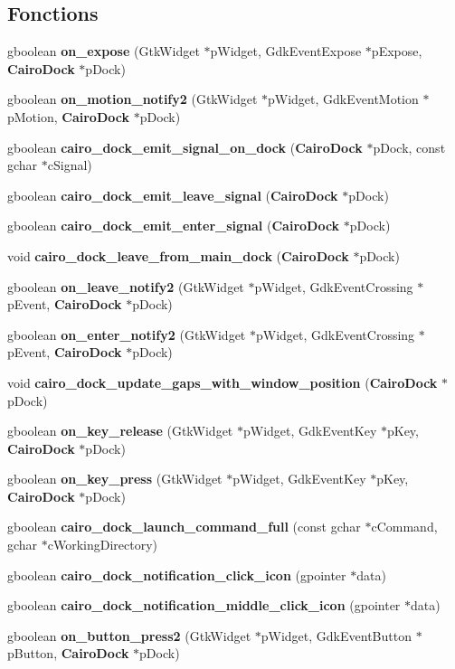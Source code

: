 \subsection*{Fonctions}
\begin{CompactItemize}
\item 
gboolean {\bf on\_\-expose} (GtkWidget $\ast$pWidget, GdkEventExpose $\ast$pExpose, {\bf CairoDock} $\ast$pDock)
\item 
gboolean {\bf on\_\-motion\_\-notify2} (GtkWidget $\ast$pWidget, GdkEventMotion $\ast$pMotion, {\bf CairoDock} $\ast$pDock)
\item 
gboolean {\bf cairo\_\-dock\_\-emit\_\-signal\_\-on\_\-dock} ({\bf CairoDock} $\ast$pDock, const gchar $\ast$cSignal)
\item 
gboolean {\bf cairo\_\-dock\_\-emit\_\-leave\_\-signal} ({\bf CairoDock} $\ast$pDock)
\item 
gboolean {\bf cairo\_\-dock\_\-emit\_\-enter\_\-signal} ({\bf CairoDock} $\ast$pDock)
\item 
void {\bf cairo\_\-dock\_\-leave\_\-from\_\-main\_\-dock} ({\bf CairoDock} $\ast$pDock)
\item 
gboolean {\bf on\_\-leave\_\-notify2} (GtkWidget $\ast$pWidget, GdkEventCrossing $\ast$pEvent, {\bf CairoDock} $\ast$pDock)
\item 
gboolean {\bf on\_\-enter\_\-notify2} (GtkWidget $\ast$pWidget, GdkEventCrossing $\ast$pEvent, {\bf CairoDock} $\ast$pDock)
\item 
void {\bf cairo\_\-dock\_\-update\_\-gaps\_\-with\_\-window\_\-position} ({\bf CairoDock} $\ast$pDock)
\item 
gboolean {\bf on\_\-key\_\-release} (GtkWidget $\ast$pWidget, GdkEventKey $\ast$pKey, {\bf CairoDock} $\ast$pDock)
\item 
gboolean {\bf on\_\-key\_\-press} (GtkWidget $\ast$pWidget, GdkEventKey $\ast$pKey, {\bf CairoDock} $\ast$pDock)
\item 
gboolean {\bf cairo\_\-dock\_\-launch\_\-command\_\-full} (const gchar $\ast$cCommand, gchar $\ast$cWorkingDirectory)
\item 
gboolean {\bf cairo\_\-dock\_\-notification\_\-click\_\-icon} (gpointer $\ast$data)
\item 
gboolean {\bf cairo\_\-dock\_\-notification\_\-middle\_\-click\_\-icon} (gpointer $\ast$data)
\item 
gboolean {\bf on\_\-button\_\-press2} (GtkWidget $\ast$pWidget, GdkEventButton $\ast$pButton, {\bf CairoDock} $\ast$pDock)
\item 

\end{CompactItemize}
